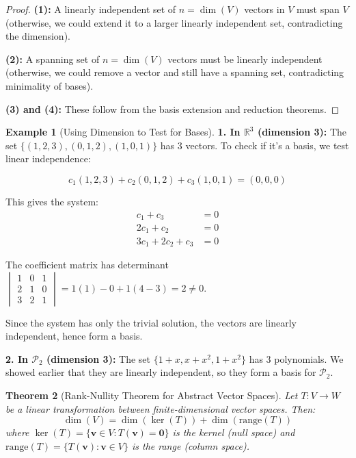 \documentclass[12pt]{article}
\numberwithin{equation}{section}
\newcommand{\vect}[1]{\boldsymbol{#1}}   %
\theoremstyle{plain}
\newtheorem{theorem}{Theorem}[section]
\theoremstyle{definition}
\newtheorem{example}[theorem]{Example}
\theoremstyle{remark}
\begin{document}
\begin{proof}
\textbf{(1):} A linearly independent set of $n = \dim(V)$ vectors in $V$ must span $V$ (otherwise, we could extend it to a larger linearly independent set, contradicting the dimension).

\textbf{(2):} A spanning set of $n = \dim(V)$ vectors must be linearly independent (otherwise, we could remove a vector and still have a spanning set, contradicting minimality of bases).

\textbf{(3) and (4):} These follow from the basis extension and reduction theorems.
\end{proof}

\begin{example}[Using Dimension to Test for Bases]
\textbf{1. In $\mathbb{R}^3$ (dimension 3):}
The set $\{(1,2,3), (0,1,2), (1,0,1)\}$ has 3 vectors. To check if it's a basis, we test linear independence:

$$c_1(1,2,3) + c_2(0,1,2) + c_3(1,0,1) = (0,0,0)$$

This gives the system:
\begin{align}
c_1 + c_3 &= 0\\
2c_1 + c_2 &= 0\\
3c_1 + 2c_2 + c_3 &= 0
\end{align}

The coefficient matrix has determinant $\begin{vmatrix} 1 & 0 & 1 \\ 2 & 1 & 0 \\ 3 & 2 & 1 \end{vmatrix} = 1(1) - 0 + 1(4-3) = 2 \neq 0$.

Since the system has only the trivial solution, the vectors are linearly independent, hence form a basis.

\textbf{2. In $\mathcal{P}_2$ (dimension 3):}
The set $\{1 + x, x + x^2, 1 + x^2\}$ has 3 polynomials. We showed earlier that they are linearly independent, so they form a basis for $\mathcal{P}_2$.
\end{example}

\begin{theorem}[Rank-Nullity Theorem for Abstract Vector Spaces]
Let $T: V \to W$ be a linear transformation between finite-dimensional vector spaces. Then:
$$\dim(V) = \dim(\ker(T)) + \dim(\text{range}(T))$$
where $\ker(T) = \{\vect{v} \in V : T(\vect{v}) = \vect{0}\}$ is the kernel (null space) and $\text{range}(T) = \{T(\vect{v}) : \vect{v} \in V\}$ is the range (column space).
\end{theorem}
\end{document}
